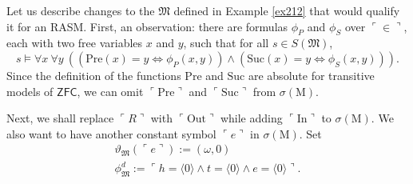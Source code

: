 \documentclass[12pt]{article}
\numberwithin{equation}{section}
\begin{document}
\begin{ex}\label{ex228}
Let us describe changes to the $\mathfrak{M}$ defined in Example \ref{ex212} that would qualify it for an RASM. First, an observation: there are formulas $\phi_P$ and $\phi_S$ over $\ulcorner \in \urcorner$, each with two free variables $x$ and $y$, such that for all $s \in S(\mathfrak{M})$,
\begin{equation*}
    s \models \forall x \ \forall y \ ((\mathrm{Pre}(x) = y \iff \phi_P(x, y)) \wedge (\mathrm{Suc}(x) = y \iff \phi_S(x, y))) \text{.}
\end{equation*}
Since the definition of the functions $\mathrm{Pre}$ and $\mathrm{Suc}$ are absolute for transitive models of $\mathsf{ZFC}$, we can omit $\ulcorner \mathrm{Pre} \urcorner$ and $\ulcorner \mathrm{Suc} \urcorner$ from $\sigma(\mathrm{M})$.

Next, we shall replace $\ulcorner R \urcorner$ with $\ulcorner \mathrm{Out} \urcorner$ while adding $\ulcorner \mathrm{In} \urcorner$ to $\sigma(\mathrm{M})$. We also want to have another constant symbol $\ulcorner e \urcorner$ in $\sigma(\mathrm{M})$. Set 
\begin{gather*}
    \vartheta_{\mathfrak{M}}(\ulcorner e \urcorner) := (\omega, 0) \\
    \phi^d_{\mathfrak{M}} := \ulcorner h = \langle 0 \rangle \wedge t = \langle 0 \rangle \wedge e = \langle 0 \rangle \urcorner \text{.}
\end{gather*}


\end{ex}
\end{document}

